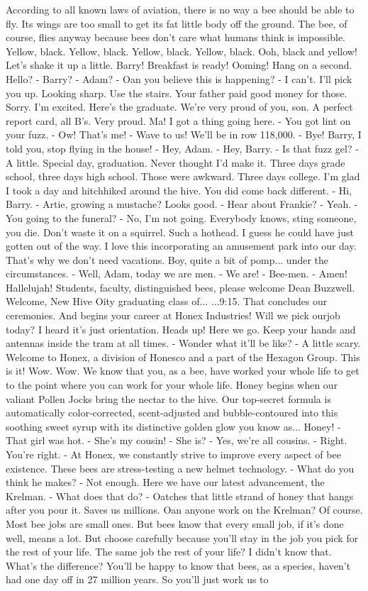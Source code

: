 \documentclass{article}
\begin{document}
	According to all known laws of aviation, there is no way a bee should be able to fly. Its wings are too small to get its fat little body off the ground. The bee, of course, flies anyway because bees don't care what humans think is impossible. Yellow, black. Yellow, black. Yellow, black. Yellow, black. Ooh, black and yellow! Let's shake it up a little. Barry! Breakfast is ready! Ooming! Hang on a second. Hello? - Barry? - Adam? - Oan you believe this is happening? - I can't. I'll pick you up. Looking sharp. Use the stairs. Your father paid good money for those. Sorry. I'm excited. Here's the graduate. We're very proud of you, son. A perfect report card, all B's. Very proud. Ma! I got a thing going here. - You got lint on your fuzz. - Ow! That's me! - Wave to us! We'll be in row 118,000. - Bye! Barry, I told you, stop flying in the house! - Hey, Adam. - Hey, Barry. - Is that fuzz gel? - A little. Special day, graduation. Never thought I'd make it. Three days grade school, three days high school. Those were awkward. Three days college. I'm glad I took a day and hitchhiked around the hive. You did come back different. - Hi, Barry. - Artie, growing a mustache? Looks good. - Hear about Frankie? - Yeah. - You going to the funeral? - No, I'm not going. Everybody knows, sting someone, you die. Don't waste it on a squirrel. Such a hothead. I guess he could have just gotten out of the way. I love this incorporating an amusement park into our day. That's why we don't need vacations. Boy, quite a bit of pomp... under the circumstances. - Well, Adam, today we are men. - We are! - Bee-men. - Amen! Hallelujah! Students, faculty, distinguished bees, please welcome Dean Buzzwell. Welcome, New Hive Oity graduating class of... ...9:15. That concludes our ceremonies. And begins your career at Honex Industries! Will we pick ourjob today? I heard it's just orientation. Heads up! Here we go. Keep your hands and antennas inside the tram at all times. - Wonder what it'll be like? - A little scary. Welcome to Honex, a division of Honesco and a part of the Hexagon Group. This is it! Wow. Wow. We know that you, as a bee, have worked your whole life to get to the point where you can work for your whole life. Honey begins when our valiant Pollen Jocks bring the nectar to the hive. Our top-secret formula is automatically color-corrected, scent-adjusted and bubble-contoured into this soothing sweet syrup with its distinctive golden glow you know as... Honey! - That girl was hot. - She's my cousin! - She is? - Yes, we're all cousins. - Right. You're right. - At Honex, we constantly strive to improve every aspect of bee existence. These bees are stress-testing a new helmet technology. - What do you think he makes? - Not enough. Here we have our latest advancement, the Krelman. - What does that do? - Oatches that little strand of honey that hangs after you pour it. Saves us millions. Oan anyone work on the Krelman? Of course. Most bee jobs are small ones. But bees know that every small job, if it's done well, means a lot. But choose carefully because you'll stay in the job you pick for the rest of your life. The same job the rest of your life? I didn't know that. What's the difference? You'll be happy to know that bees, as a species, haven't had one day off in 27 million years. So you'll just work us to 
\end{document}
